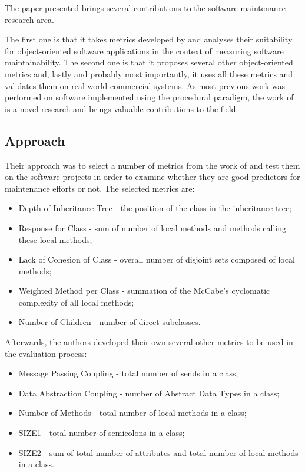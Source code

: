 \documentclass[a4paper,12pt]{article}
\begin{document}
The paper presented brings several contributions to the software maintenance
research area. 

The first one is that it takes metrics developed by \citet{chidamber1994metrics} 
and analyses their suitability for object-oriented software applications in the 
context of measuring software maintainability. The second one is that it proposes 
several other object-oriented metrics and, lastly and probably most importantly, it 
uses all these metrics and validates them on real-world commercial systems. 
As most previous work was performed on software implemented using
the procedural paradigm, the work of \citet{li1993maintenance} is a novel research
and brings valuable contributions to the field.

\subsection{Approach}

Their approach was to select a number of metrics from the work of 
\citet{chidamber1994metrics} and test them on the software projects in 
order to examine whether they are good predictors for maintenance efforts 
or not. The selected metrics are:

 \begin{itemize}
  \item Depth of Inheritance Tree - the position of the class in the inheritance tree;
  \item Response for Class - sum of number of local methods and methods calling these
    local methods;
  \item Lack of Cohesion of Class - overall number of disjoint sets composed of 
    local methods;
  \item Weighted Method per Class - summation of the McCabe's cyclomatic complexity
    of all local methods;
  \item Number of Children - number of direct subclasses.
 \end{itemize}

Afterwards, the authors developed their own several other metrics to be used in the 
evaluation process:

 \begin{itemize}
  \item Message Passing Coupling - total number of sends in a class;
  \item Data Abstraction Coupling - number of Abstract Data Types in a class;
  \item Number of Methods - total number of local methods in a class;
  \item SIZE1 - total number of semicolons in a class;
  \item SIZE2 - sum of total number of attributes and total number of local methods 
    in a class.
 \end{itemize}
\end{document}
